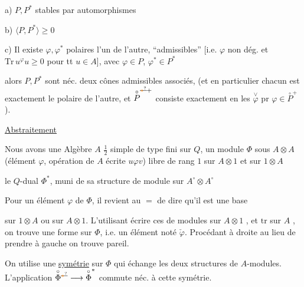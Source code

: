 a) $P,P^*$ stables par automorphismes

b) $\langle P,P^*\rangle\geq0$

c) Il existe $\varphi,\varphi^*$ polaires l'un de l'autre,
``admissibles'' [i.e.  $\varphi$ non dég. et
$\mathrm{Tr}\,u^\varphi u\geq0$ pour tt $u\in A$], avec $\varphi\in P$, $\varphi^*\in P^*$

alors $P,P^*$ sont néc. deux cônes admissibles
associés, (et en particulier chacun est
exactement le polaire de l'autre, et $\overset{\circ}{P}^{\deleted{\unsure{*}}+}$
consiste exactement en les $\overset{\vee}{\varphi}$ pr $\varphi\in\overset{\circ}{P}^+$).

\uline{Abstraitement}

Nous avons une Algèbre $A$ $\frac12$ simple de type fini sur $Q$,
un module  $\Phi$ sous $A\otimes A$ (élément $\varphi$,
opération de $A$ écrite $u\varphi v$)  libre
de rang $1$ sur $A\otimes1$ et sur $1\otimes A$

le  $Q$-dual $\Phi^*$,  muni de sa
structure de module sur $A^\circ\otimes A^\circ$

Pour un élément $\varphi$ de $\Phi$, il revient au $=$
de dire qu'il est une base 


sur $1\otimes A$ ou sur $A\otimes1$. L'utilisant
 écrire ces  de modules sur
$A\otimes1$ , et  $\mathrm{tr}$ sur $A$
, on
trouve une forme sur $\Phi$, i.e. un élément noté
$\check\varphi$. Procédant à droite au lieu de prendre
à gauche on trouve pareil.

On  utilise une \uline{symétrie} sur $\Phi$ qui
échange les deux structures de $A$-modules.
L'application $\overset{\circ}{\Phi}{}^{\deleted{\unsure{*}}}\longrightarrow\overset{\circ}{\Phi}^{*}$
commute néc. à cette symétrie.

